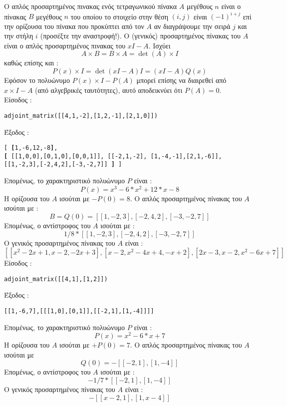 \documentclass[a4paper,11pt]{book}
\newcommand{\en}{\selectlanguage{english}}
\begin{document}
Ο απλός προσαρτημένος πινακας ενός τετραγωνικού πίνακα $A$ μεγέθους $n$ είναι ο πίνακας $B$ 
μεγέθους $n$ του οποίου το στοιχείο στην θέση $(i,j)$ είναι $(-1)^{i+j}$ επί την ορίζουσα του πίνακα που προκύπτει από τον $A$ αν διαγράψουμε την σειρά $j$ και την στήλη $i$ (προσέξτε την αναστροφή!). Ο (γενικός) προσαρτημένος πίνακας του $A$ είναι ο απλός προσαρτημένος πινακας του { \tt $xI-A$}. 
Ισχύει \[ A\times B = B\times A = \det(A)\times I \] 
καθώς επίσης και :
\[ P(x)\times I=\det(xI-A)I=(xI-A)Q(x)\]
Εφόσον το πολυώνυμο $P(x)\times I-P(A)$ 
μπορεί επίσης να διαιρεθεί από $x\times I-A$ (από αλγεβρικές ταυτότητες), 
αυτό αποδεικνύει ότι $P(A)=0$.\\
Είσοδος :
\begin{center}{\en\tt adjoint\_matrix([[4,1,-2],[1,2,-1],[2,1,0]])}\end{center}
Έξοδος :
\begin{center}
{\en\tt [
  {\bf [}1,-6,12,-8{\bf ]},\\
{\bf [} [[1,0,0],[0,1,0],[0,0,1]],
  [[-2,1,-2], [1,-4,-1],[2,1,-6]],
  [[1,-2,3],[-2,4,2],[-3,-2,7]] {\bf ]}
] }\end{center}
Επομένως, το χαρακτηριστικό πολυώνυμο  $P$ είναι :
\[ P(x)=x^3-6*x^2+12*x-8 \]
Η ορίζουσα του $A$ ισούται με $-P(0)=8$.
Ο απλός προσαρτημένος πίνακας του $A$ ισούται με :
\[ B=Q(0)=[[1,-2,3],[-2,4,2],[-3,-2,7]] \]
Επομένως, ο αντίστροφος του $A$ ισούται με :
\[ 1/8*[[1,-2,3],[-2,4,2],[-3,-2,7]] \]
Ο γενικός προσαρτημένος πίνακας του $A$ είναι :
\[ [[x^2-2x+1,x-2,-2x+3],[x-2,x^2-4x+4,-x+2],[2x-3,x-2,x^2-6x+7]] \]
Είσοδος :
\begin{center}{\en\tt adjoint\_matrix([[4,1],[1,2]])}\end{center}
Έξοδος :
\begin{center}{\en\tt[[1,-6,7],[[[1,0],[0,1]],[[-2,1],[1,-4]]]]}\end{center}
Επομένως, το χαρακτηριστικό πολυώνυμο $P$ είναι :
\[ P(x)=x^2-6*x+7 \]
Η ορίζουσα του $A$ ισούται με $+P(0)=7$.
Ο απλός προσαρτημένος πίνακας του $A$ ισούται με 
\[ Q(0)= -[[-2,1],[1,-4]] \]
Επομένως, ο αντίστροφος του $A$ ισούται με :
\[ -1/7*[[-2,1],[1,-4]] \]
Ο γενικός προσαρτημένος πίνακας του $A$ είναι :
\[ -[[x-2,1],[1,x-4]] \]
\end{document}
